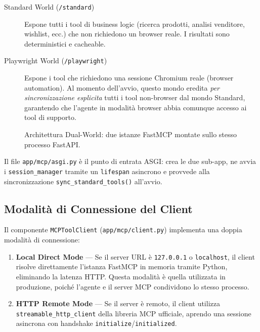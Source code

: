 \begin{description}
    \item[Standard World (\texttt{/standard})] Espone tutti i tool di
        business logic (ricerca prodotti, analisi venditore, wishlist,
        ecc.) che non richiedono un browser reale. I risultati sono
        deterministici e cacheable.

    \item[Playwright World (\texttt{/playwright})] Espone i tool che
        richiedono una sessione Chromium reale (browser automation).
        Al momento dell'avvio, questo mondo eredita \emph{per
        sincronizzazione esplicita} tutti i tool non-browser dal mondo
        Standard, garantendo che l'agente in modalità browser abbia
        comunque accesso ai tool di supporto.
\end{description}

\begin{figure}[htbp]
    \centering
    \caption{Architettura Dual-World: due istanze FastMCP montate sullo
    stesso processo FastAPI.}
    \label{fig:mcp-dual-world}
\end{figure}

Il file \texttt{app/mcp/asgi.py} è il punto di entrata ASGI: crea le
due sub-app, ne avvia i \texttt{session\_manager} tramite un
\texttt{lifespan} asincrono e provvede alla sincronizzazione
\texttt{sync\_standard\_tools()} all'avvio.

\subsection{Modalità di Connessione del Client}
\label{subsec:mcp-client-modes}

Il componente \texttt{MCPToolClient} (\texttt{app/mcp/client.py})
implementa una doppia modalità di connessione:

\begin{enumerate}
    \item \textbf{Local Direct Mode} — Se il server URL è
        \texttt{127.0.0.1} o \texttt{localhost}, il client risolve
        direttamente l'istanza FastMCP in memoria tramite Python,
        eliminando la latenza HTTP. Questa modalità è quella utilizzata
        in produzione, poiché l'agente e il server MCP condividono lo
        stesso processo.

    \item \textbf{HTTP Remote Mode} — Se il server è remoto, il
        client utilizza \texttt{streamable\_http\_client} della libreria
        MCP ufficiale, aprendo una sessione asincrona con handshake
        \texttt{initialize}/\texttt{initialized}.
\end{enumerate}

